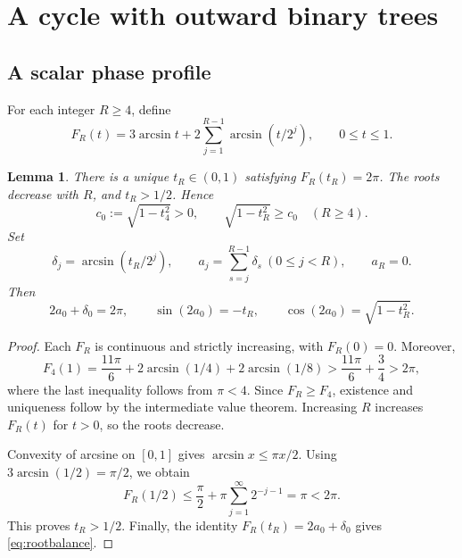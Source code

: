 \documentclass[11pt]{article}
\newtheorem{lemma}[theorem]{Lemma}
\theoremstyle{definition}
\theoremstyle{remark}
\newcommand{\asin}{\operatorname{arcsin}}
\begin{document}
\section{A cycle with outward binary trees}

\subsection{A scalar phase profile}

For each integer $R\ge4$, define
\begin{equation}\label{eq:F}
 F_R(t)=3\asin t+2\sum_{j=1}^{R-1}\asin(t/2^j),\qquad 0\le t\le1.
\end{equation}

\begin{lemma}\label{lem:profile}
There is a unique $t_R\in(0,1)$ satisfying $F_R(t_R)=2\pi$.
The roots decrease with $R$, and $t_R>1/2$. Hence
\begin{equation}\label{eq:c0}
 c_0:=\sqrt{1-t_4^2}>0,\qquad \sqrt{1-t_R^2}\ge c_0\quad(R\ge4).
\end{equation}
Set
\begin{equation}\label{eq:profile}
 \delta_j=\asin(t_R/2^j),\qquad
 a_j=\sum_{s=j}^{R-1}\delta_s\ (0\le j<R),\qquad a_R=0.
\end{equation}
Then
\begin{equation}\label{eq:rootbalance}
 2a_0+\delta_0=2\pi,\qquad
 \sin(2a_0)=-t_R,\qquad
 \cos(2a_0)=\sqrt{1-t_R^2}.
\end{equation}
\end{lemma}

\begin{proof}
Each $F_R$ is continuous and strictly increasing, with $F_R(0)=0$.
Moreover,
\[
 F_4(1)=\frac{11\pi}{6}+2\asin(1/4)+2\asin(1/8)
       >\frac{11\pi}{6}+\frac34>2\pi,
\]
where the last inequality follows from $\pi<4$.
Since $F_R\ge F_4$, existence and uniqueness follow by the intermediate
value theorem. Increasing $R$ increases $F_R(t)$ for $t>0$, so the roots
decrease.

Convexity of arcsine on $[0,1]$ gives $\asin x\le\pi x/2$.
Using $3\asin(1/2)=\pi/2$, we obtain
\[
 F_R(1/2)\le\frac\pi2+\pi\sum_{j=1}^{\infty}2^{-j-1}=\pi<2\pi.
\]
This proves $t_R>1/2$. Finally, the identity
$F_R(t_R)=2a_0+\delta_0$ gives \eqref{eq:rootbalance}.
\end{proof}
\end{document}

